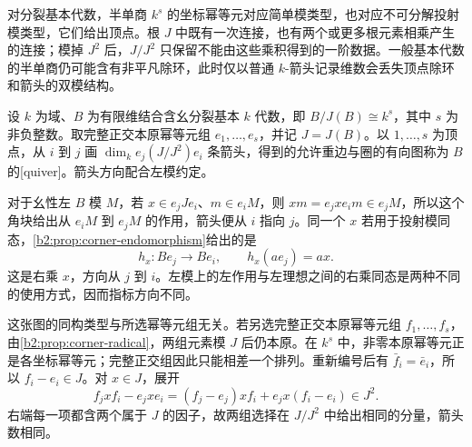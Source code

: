 对分裂基本代数，半单商 \(k^s\) 的坐标幂等元对应简单模类型，也对应不可分解投射模类型，它们给出顶点。根 \(J\) 中既有一次连接，也有两个或更多根元素相乘产生的连接；模掉 \(J^2\) 后，\(J/J^2\) 只保留不能由这些乘积得到的一阶数据。一般基本代数的半单商仍可能含有非平凡除环，此时仅以普通 \(k\)-箭头记录维数会丢失顶点除环和箭头的双模结构。

\begin{definition}\label{b2:def:basic-algebra-quiver}
	设 \(k\) 为域、\(B\) 为有限维结合含幺分裂基本 \(k\) 代数，即 \(B/J(B)\cong k^s\)，其中 \(s\) 为非负整数。取完整正交本原幂等元组 \(e_1,\ldots,e_s\)，并记 \(J=J(B)\)。以 \(1,\ldots,s\) 为顶点，从 \(i\) 到 \(j\) 画 \(\dim_k e_j(J/J^2)e_i\) 条箭头，得到的允许重边与圈的有向图称为 \(B\) 的[quiver]。箭头方向配合左模约定。
\end{definition}

对于幺性左 \(B\) 模 \(M\)，若 \(x\in e_jJe_i\)、\(m\in e_iM\)，则 \(xm=e_jxe_im\in e_jM\)，所以这个角块给出从 \(e_iM\) 到 \(e_jM\) 的作用，箭头便从 \(i\) 指向 \(j\)。同一个 \(x\) 若用于投射模同态，\cref{b2:prop:corner-endomorphism}给出的是
\[
	h_x:Be_j\longrightarrow Be_i,\qquad h_x(ae_j)=ax.
\]
这是右乘 \(x\)，方向从 \(j\) 到 \(i\)。左模上的左作用与左理想之间的右乘同态是两种不同的使用方式，因而指标方向不同。

\ProseParagraphBreak
这张图的同构类型与所选幂等元组无关。若另选完整正交本原幂等元组 \(f_1,\ldots,f_s\)，由\cref{b2:prop:corner-radical}，两组元素模 \(J\) 后仍本原。在 \(k^s\) 中，非零本原幂等元正是各坐标幂等元；完整正交组因此只能相差一个排列。重新编号后有 \(\bar f_i=\bar e_i\)，所以 \(f_i-e_i\in J\)。对 \(x\in J\)，展开
\[
	f_jxf_i-e_jxe_i =(f_j-e_j)xf_i+e_jx(f_i-e_i)\in J^2.
\]
右端每一项都含两个属于 \(J\) 的因子，故两组选择在 \(J/J^2\) 中给出相同的分量，箭头数相同。

